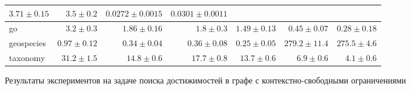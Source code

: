 \begin{frame}
\begin{figure}[H]
\begin{table}[]
{\begin{tabular}{|l|rrrrrr|}
  \multicolumn{1}{r|}{$3.71 \pm 0.15$} &
  \multicolumn{1}{r|}{$3.5 \pm 0.2$} &
  \multicolumn{1}{r|}{$0.0272 \pm 0.0015$} &
  $0.0301 \pm 0.0011$ \\ \hline
go &
  \multicolumn{1}{r|}{$3.2 \pm 0.3$} &
  \multicolumn{1}{r|}{$1.86 \pm 0.16$} &
  \multicolumn{1}{r|}{$1.8 \pm 0.3$} &
  \multicolumn{1}{r|}{$1.49 \pm 0.13$} &
  \multicolumn{1}{r|}{$0.45 \pm 0.07$} &
  $0.28 \pm 0.18$ \\ \hline
geospecies &
  \multicolumn{1}{r|}{$0.97 \pm 0.12$} &
  \multicolumn{1}{r|}{$0.34 \pm 0.04$} &
  \multicolumn{1}{r|}{$0.36 \pm 0.08$} &
  \multicolumn{1}{r|}{$0.25 \pm 0.05$} &
  \multicolumn{1}{r|}{$279.2 \pm 11.4$} &
  $275.5 \pm 4.6$ \\ \hline
taxonomy &
  \multicolumn{1}{r|}{$31.2 \pm 1.5$} &
  \multicolumn{1}{r|}{$14.8 \pm 0.6$} &
  \multicolumn{1}{r|}{$17.7 \pm 0.8$} &
  \multicolumn{1}{r|}{$13.7 \pm 0.6$} &
  \multicolumn{1}{r|}{$6.9 \pm 0.6$} &
  $4.1 \pm 0.6$ \\ \hline
\end{tabular}%
}
\end{table}
    \caption{Результаты экспериментов на задаче поиска достижимостей в графе с контекстно-свободными ограничениями}
\end{figure}
\end{frame}

